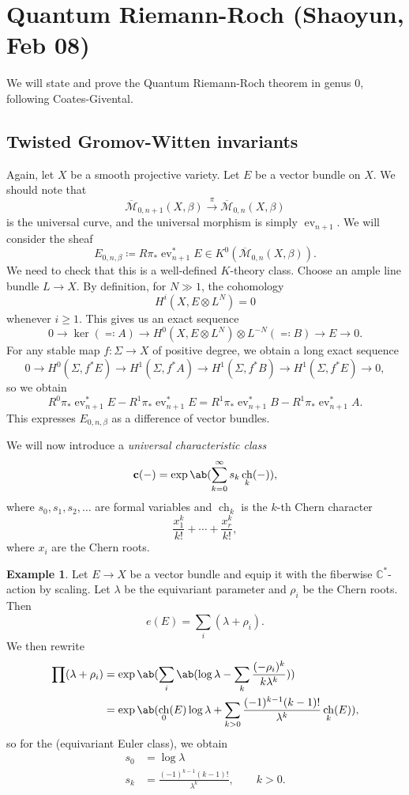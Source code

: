 \documentclass[leqno, openany]{memoir}
\theoremstyle{definition}
\newtheorem{exm}[thm]{Example}
\theoremstyle{remark}
\theoremstyle{plain}
\theoremstyle{definition}
\theoremstyle{remark}
\newcommand{\C}{\mathbb{C}}
\newcommand{\mbf}[1]{\mathbf{#1}}
\newcommand{\on}[1]{\operatorname{#1}}
\newcommand{\Mbar}{\overline{\mathcal{M}}}
\DeclareMathOperator{\ch}{ch}
\DeclareMathOperator{\ev}{ev}
\begin{document}
\section{Quantum Riemann-Roch (Shaoyun, Feb 08)}

We will state and prove the Quantum Riemann-Roch theorem in genus $0$, following Coates-Givental.

\subsection{Twisted Gromov-Witten invariants}

Again, let $X$ be a smooth projective variety. Let $E$ be a vector bundle on $X$. We should note that 
\[ \Mbar_{0,n+1}(X,\beta) \xrightarrow{\pi} \Mbar_{0,n}(X,\beta) \]
is the universal curve, and the universal morphism is simply $\on{ev}_{n+1}$. We will consider the sheaf
\[ E_{0,n,\beta} \coloneqq R\pi_* \on{ev}_{n+1}^* E \in K^0(\Mbar_{0,n}(X, \beta)). \]
We need to check that this is a well-defined $K$-theory class. Choose an ample line bundle $L \to X$. By definition, for $N \gg 1$, the cohomology
\[ H^i(X, E \otimes L^N) = 0 \]
whenever $i \geq 1$. This gives us an exact sequence
\[ 0 \to \ker ( \eqqcolon A ) \to H^0(X, E \otimes L^N) \otimes L^{-N} ( \eqqcolon B ) \to E \to 0. \]
For any stable map $f \colon \Sigma \to X$ of positive degree, we obtain a long exact sequence
\begin{equation*}
    0 \to H^0(\Sigma, f^* E) \to H^1(\Sigma, f^* A) \to H^1(\Sigma, f^* B) \to H^1(\Sigma, f^* E) \to 0,
\end{equation*}
so we obtain
\[ R^0 \pi_* \ev_{n+1}^* E - R^1 \pi_* \ev_{n+1}^* E = R^1 \pi_* \ev_{n+1}^* B - R^1 \pi_* \ev_{n+1}^* A. \]
This expresses $E_{0,n,\beta}$ as a difference of vector bundles.

We will now introduce a \textit{universal characteristic class}
\[ \mbf{c}(-) = \exp \ab( \sum_{k=0}^{\infty} s_k \ch_k(-)), \]
where $s_0, s_1, s_2, \ldots$ are formal variables and $\ch_k$ is the $k$-th Chern character
\[ \frac{x_1^k}{k!} + \cdots + \frac{x_r^k}{k!}, \]
where $x_i$ are the Chern roots.

\begin{exm}
    Let $E \to X$ be a vector bundle and equip it with the fiberwise $\C^*$-action by scaling. Let $\lambda$ be the equivariant parameter and $\rho_i$ be the Chern roots. Then
    \[ e(E) = \sum_i (\lambda + \rho_i). \]
    We then rewrite
    \begin{align*}
        \prod( \lambda + \rho_i) &= \exp\ab(\sum_i \ab(\log \lambda - \sum_k \frac{(-\rho_i)^k}{k\lambda^k})) \\
        &= \exp\ab(\ch_0(E) \log \lambda + \sum_{k > 0} \frac{(-1)^{k-1}(k-1)!}{\lambda^k} \ch_k(E)),
    \end{align*}
    so for the (equivariant Euler class), we obtain
    \begin{align*}
        s_0 &= \log \lambda \\
        s_k &= \frac{(-1)^{k-1} (k-1)!}{\lambda^k}, \qquad k > 0.
    \end{align*}
\end{exm}
\end{document}
